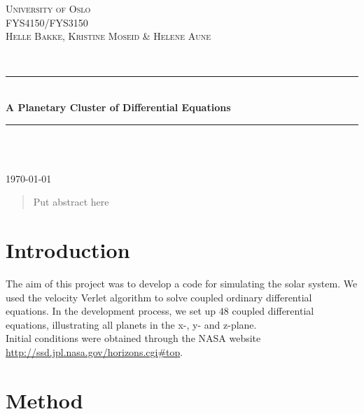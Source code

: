 \documentclass[12pt]{article}
\begin{document}
\begin{titlepage}

\newcommand{\HRule}{\rule{\linewidth}{0.5mm}} 
\center

\textsc{\LARGE University of Oslo}\\[1.5cm] 
\textsc{\Large FYS4150/FYS3150}\\[0.3cm] 
\textsc{\large Helle Bakke, Kristine Moseid \& Helene Aune}\\[0.5cm] 

\begin{minipage}{0.4\textwidth}
\end{minipage}\\[1cm]

\HRule \\[0.4cm]
{ \huge \bfseries A Planetary Cluster of Differential Equations}\\[0.4cm] 
\HRule \\[1.5cm]
 
\begin{minipage}{0.4\textwidth}
\end{minipage}\\[8cm]


{\large \today}\\[3cm] 
\vfill 

\end{titlepage}

\newpage
\tableofcontents

\newpage


\begin{abstract}
\noindent Put abstract here
\end{abstract}

\section{Introduction}

\noindent The aim of this project was to develop a code for simulating the solar system. We used the velocity Verlet algorithm to solve coupled ordinary differential equations. In the development process, we set up $48$ coupled differential equations, illustrating all planets in the x-, y- and z-plane.\\

\noindent Initial conditions were obtained through the NASA website \url{http://ssd.jpl.nasa.gov/horizons.cgi#top}.

\section{Method}
\end{document}
